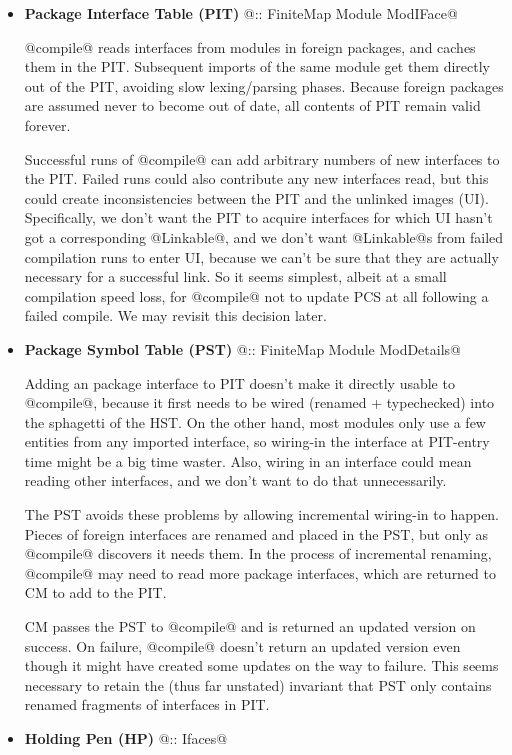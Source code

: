 \documentclass[11pt]{article}
\begin{document}
   \begin{itemize}
   \item
      {\bf Package Interface Table (PIT)} @:: FiniteMap Module ModIFace@

   @compile@ reads interfaces from modules in foreign packages, and
   caches them in the PIT.  Subsequent imports of the same module get
   them directly out of the PIT, avoiding slow lexing/parsing phases.
   Because foreign packages are assumed never to become out of date,
   all contents of PIT remain valid forever.

   Successful runs of @compile@ can add arbitrary numbers of new
   interfaces to the PIT.  Failed runs could also contribute any new
   interfaces read, but this could create inconsistencies between the
   PIT and the unlinked images (UI).  Specifically, we don't want the
   PIT to acquire interfaces for which UI hasn't got a corresponding
   @Linkable@, and we don't want @Linkable@s from failed compilation
   runs to enter UI, because we can't be sure that they are actually
   necessary for a successful link.  So it seems simplest, albeit at a
   small compilation speed loss, for @compile@ not to update PCS at
   all following a failed compile.  We may revisit this
   decision later.

   \item
      {\bf Package Symbol Table (PST)} @:: FiniteMap Module ModDetails@

   Adding an package interface to PIT doesn't make it directly usable
   to @compile@, because it first needs to be wired (renamed +
   typechecked) into the sphagetti of the HST.  On the other hand,
   most modules only use a few entities from any imported interface,
   so wiring-in the interface at PIT-entry time might be a big time
   waster.  Also, wiring in an interface could mean reading other
   interfaces, and we don't want to do that unnecessarily.

   The PST avoids these problems by allowing incremental wiring-in to
   happen.  Pieces of foreign interfaces are renamed and placed in the
   PST, but only as @compile@ discovers it needs them.  In the process
   of incremental renaming, @compile@ may need to read more package
   interfaces, which are returned to CM to add to the PIT.

   CM passes the PST to @compile@ and is returned an updated version
   on success.  On failure, @compile@ doesn't return an updated
   version even though it might have created some updates on the way
   to failure.  This seems necessary to retain the (thus far unstated)
   invariant that PST only contains renamed fragments of interfaces in
   PIT.

   \item
      {\bf Holding Pen (HP)} @:: Ifaces@

   \end{itemize}
\end{document}
